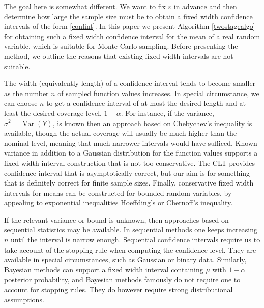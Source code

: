 \documentclass[graybox]{svmult}
\DeclareMathOperator{\var}{Var}
\begin{document}
The goal here is somewhat different.  We want to fix $\varepsilon$ in advance and then determine how large the sample size must be to obtain a fixed
width confidence intervals of the form \eqref{confint}. In this paper we present Algorithm \ref{twostagealgo} for obtaining such a fixed width
confidence interval for the mean of a real random
variable, which is suitable for Monte Carlo sampling.
Before presenting the method, we outline the reasons
that existing fixed width intervals are not suitable.

The width (equivalently length) of a confidence interval
tends to become smaller as the number $n$ of sampled
function values increases.
In special circumstance, we can choose $n$ to get
a confidence interval of at most the desired length and at
least the desired coverage level, $1-\alpha$. For instance, if the variance, $\sigma^2=\var(Y)$, is known then an approach based on Chebychev's
inequality is available, though the actual coverage
will usually be much higher than the nominal level,
meaning that much narrower intervals would have sufficed.
Known variance in addition to a Gaussian distribution for the function values
supports a fixed width interval construction that
is not too conservative. The CLT provides confidence interval that is asymptotically correct, but our aim is for something that is definitely correct for finite sample sizes.
Finally, conservative fixed width intervals
for means can be constructed for bounded random variables, by appealing
to exponential inequalities Hoeffding's or Chernoff's inequality.

If the relevant variance or bound is unknown, then approaches
based on sequential statistics \citep{Sie85a}
may be available. In sequential methods one keeps increasing
$n$ until the interval is narrow enough. Sequential
confidence intervals require us to take account of the
stopping rule when computing the confidence level. They
are available in special circumstances, such as Gaussian
or binary data.
Similarly, Bayesian methods can support a fixed width
interval containing $\mu$ with $1-\alpha$ posterior probability, and
Bayesian methods famously do not require one to account
for stopping rules. They do however require strong distributional assumptions.
\end{document}
